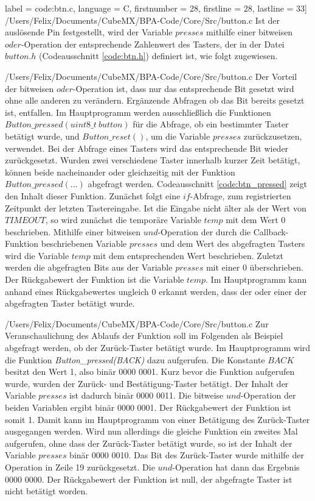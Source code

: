 label = code:btn.c, 
language = C, 
firstnumber = 28, 
firstline = 28, 
lastline = 33]
{/Users/Felix/Documents/CubeMX/BPA-Code/Core/Src/button.c}
Ist der auslösende Pin festgestellt, wird der Variable $presses$ mithilfe einer bitweisen $oder$-Operation der entsprechende Zahlenwert des Tasters, der in der Datei $button.h$ (Codeausschnitt \ref{code:btn.h}) definiert ist, wie folgt zugewiesen.

{/Users/Felix/Documents/CubeMX/BPA-Code/Core/Src/button.c}
Der Vorteil der bitweisen $oder$-Operation ist, dass nur das entsprechende Bit gesetzt wird ohne alle anderen zu verändern. Ergänzende Abfragen ob das Bit bereits gesetzt ist, entfallen.
Im Hauptprogramm werden ausschließlich die Funktionen $Button\_pressed(uint8\_t\ button)$ für die Abfrage, ob ein bestimmter Taster betätigt wurde, und $Button\_reset()$, um die Variable $presses$ zurückzusetzen, verwendet. Bei der Abfrage eines Tasters wird das entsprechende Bit wieder zurückgesetzt. Wurden zwei verschiedene Taster innerhalb kurzer Zeit betätigt, können beide nacheinander oder gleichzeitig mit der Funktion $Button\_pressed(...)$ abgefragt werden. Codeausschnitt \ref{code:btn_pressed} zeigt den Inhalt dieser Funktion. Zunächst folgt eine $if$-Abfrage, zum registrierten Zeitpunkt der letzten Tastereingabe. Ist die Eingabe nicht älter als der Wert von $TIMEOUT$, so wird zunächst die temporäre Variable $temp$ mit dem Wert 0 beschrieben. Mithilfe einer bitweisen $und$-Operation der durch die Callback-Funktion beschriebenen Variable $presses$ und dem Wert des abgefragten Tasters wird die Variable $temp$ mit dem entsprechenden Wert beschrieben. Zuletzt werden die abgefragten Bits aus der Variable $presses$ mit einer $0$ überschrieben. Der Rückgabewert der Funktion ist die Variable $temp$. Im Hauptprogramm kann anhand eines Rückgabewertes ungleich $0$ erkannt werden, dass der oder einer der abgefragten Taster betätigt wurde.

{/Users/Felix/Documents/CubeMX/BPA-Code/Core/Src/button.c}
Zur Veranschaulichung des Ablaufs der Funktion soll im Folgenden als Beispiel abgefragt werden, ob der Zurück-Taster betätigt wurde. Im Hauptprogramm wird die Funktion \textit{Button\_pressed(BACK)} dazu aufgerufen. Die Konstante $BACK$ besitzt den Wert 1, also binär 0000 0001. Kurz bevor die Funktion aufgerufen wurde, wurden der Zurück- und Bestätigung-Taster betätigt. Der Inhalt der Variable $presses$ ist dadurch binär 0000 0011. Die bitweise $und$-Operation der beiden Variablen ergibt binär 0000 0001. Der Rückgabewert der Funktion ist somit 1. Damit kann im Hauptprogramm von einer Betätigung des Zurück-Taster ausgegangen werden. Wird nun allerdings die gleiche Funktion ein zweites Mal aufgerufen, ohne dass der Zurück-Taster betätigt wurde, so ist der Inhalt der Variable $presses$ binär 0000 0010. Das Bit des Zurück-Taster wurde mithilfe der Operation in Zeile 19 zurückgesetzt. Die $und$-Operation hat dann das Ergebnis 0000 0000. Der Rückgabewert der Funktion ist null, der abgefragte Taster ist nicht betätigt worden.\\
